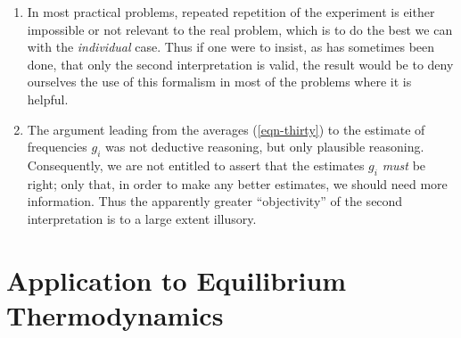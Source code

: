\documentclass[]{article}
\begin{document}
\begin{enumerate}

\item
  In most practical problems, repeated repetition of the experiment is
  either impossible or not relevant to the real problem, which is to do
  the best we can with the \emph{individual} case. Thus if one were to
  insist, as has sometimes been done, that only the second
  interpretation is valid, the result would be to deny ourselves the use
  of this formalism in most of the problems where it is helpful.
\item
  The argument leading from the averages (\ref{eqn-thirty}) to the estimate of
  frequencies \(g_{i}\) was not deductive reasoning, but only plausible
  reasoning. Consequently, we are not entitled to assert that the
  estimates \(g_{i}\) \emph{must} be right; only that, in order to make
  any better estimates, we should need more information. Thus the
  apparently greater ``objectivity'' of the second interpretation is to
  a large extent illusory.
\end{enumerate}

\section{Application to Equilibrium Thermodynamics}
\end{document}
